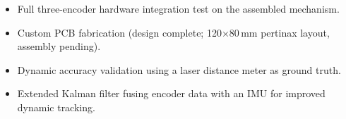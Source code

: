\documentclass[11pt,a4paper]{article}
\begin{document}
\begin{itemize}[noitemsep, topsep=4pt]
  \item Full three-encoder hardware integration test on the assembled
        mechanism.
  \item Custom PCB fabrication (design complete; 120\(\times\)80\,mm
        pertinax layout, assembly pending).
  \item Dynamic accuracy validation using a laser distance meter as
        ground truth.
  \item Extended Kalman filter fusing encoder data with an IMU for
        improved dynamic tracking.
\end{itemize}
\end{document}
